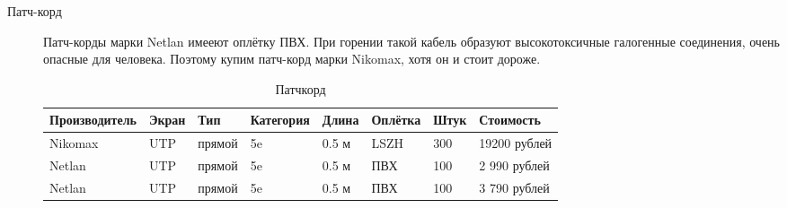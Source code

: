 \begin{description}
\item[Патч-корд]
  Патч-корды марки Netlan имееют оплётку ПВХ. При горении такой кабель образуют высокотоксичные галогенные соединения, очень опасные для человека. Поэтому купим патч-корд марки Nikomax, хотя он и стоит дороже.
\begin{table}[!htp]
    \centering
    \begin{tabular}{|l|l|l|l|l|l|l|l|}%
      \hline
      Производитель & Экран & Тип & Категория & Длина & Оплётка & Штук & Стоимость \\ \hline
      Nikomax & UTP & прямой & 5e & 0.5 м & LSZH & 300 & 19200 рублей \\ \hline
      Netlan & UTP & прямой & 5e & 0.5 м & ПВХ & 100 & 2 990 рублей \\ \hline
      Netlan & UTP & прямой & 5e & 0.5 м & ПВХ & 100 &3 790 рублей \\ \hline
    \end{tabular}
    \caption{Патчкорд}
    \label{table:patchcord}
  \end{table}
  

\end{description}
